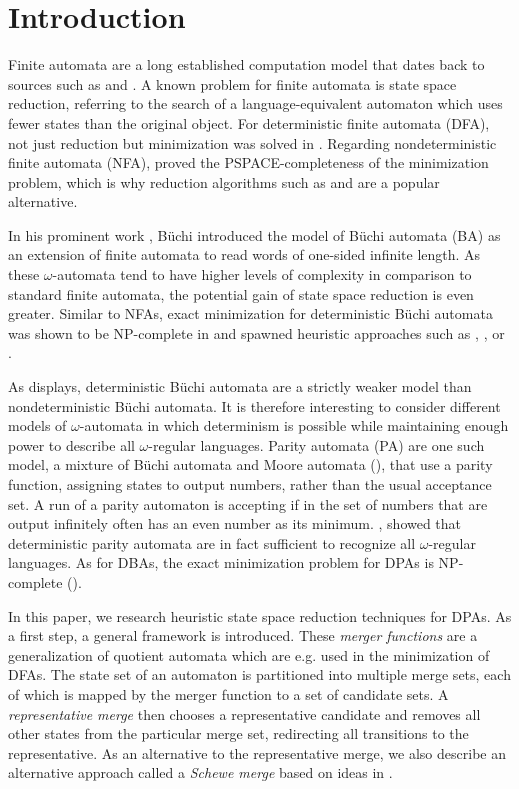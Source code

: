\section*{Introduction}

Finite automata are a long established computation model that dates back to sources such as \cite{McCulloch1990} and \cite{RabinScott1959}. A known problem for finite automata is state space reduction, referring to the search of a language-equivalent automaton which uses fewer states than the original object. For deterministic finite automata (DFA), not just reduction but minimization was solved in \cite{Hopcroft1971}. Regarding nondeterministic finite automata (NFA), \cite{JianRavikumar1991} proved the PSPACE-completeness of the minimization problem, which is why reduction algorithms such as \cite{ChamparnaudCoulon2004} and \cite{BonchiPous2013} are a popular alternative.

In his prominent work \cite{Buchi1966}, B\"uchi introduced the model of B\"uchi automata (BA) as an extension of finite automata to read words of one-sided infinite length. As these $\omega$-automata tend to have higher levels of complexity in comparison to standard finite automata, the potential gain of state space reduction is even greater. Similar to NFAs, exact minimization for deterministic B\"uchi automata was shown to be NP-complete in \cite{Schewe2010} and spawned heuristic approaches such as \cite{Schewe2010}, \cite{MayrClemente2012}, or \cite{EtessamiWilkeSchuller2001}. 

As \cite{Thomas1991} displays, deterministic B\"uchi automata are a strictly weaker model than nondeterministic Büchi automata. It is therefore interesting to consider different models of $\omega$-automata in which determinism is possible while maintaining enough power to describe all $\omega$-regular languages. Parity automata (PA) are one such model, a mixture of B\"uchi automata and Moore automata (\cite{Moore56}), that use a parity function, assigning states to output numbers, rather than the usual acceptance set. A run of a parity automaton is accepting if in the set of numbers that are output infinitely often has an even number as its minimum.
\cite{Mostowski1991}, \cite{Thomas1997} showed that deterministic parity automata are in fact sufficient to recognize all $\omega$-regular languages. As for DBAs, the exact minimization problem for DPAs is NP-complete (\cite{Schewe2010}).
\vspace{5pt}

In this paper, we research heuristic state space reduction techniques for DPAs. As a first step, a general framework is introduced. These \emph{merger functions} are a generalization of quotient automata which are e.g. used in the minimization of DFAs. The state set of an automaton is partitioned into multiple merge sets, each of which is mapped by the merger function to a set of candidate sets. A \emph{representative merge} then chooses a representative candidate and removes all other states from the particular merge set, redirecting all transitions to the representative. As an alternative to the representative merge, we also describe an alternative approach called a \emph{Schewe merge} based on ideas in \cite{Schewe2010}.

